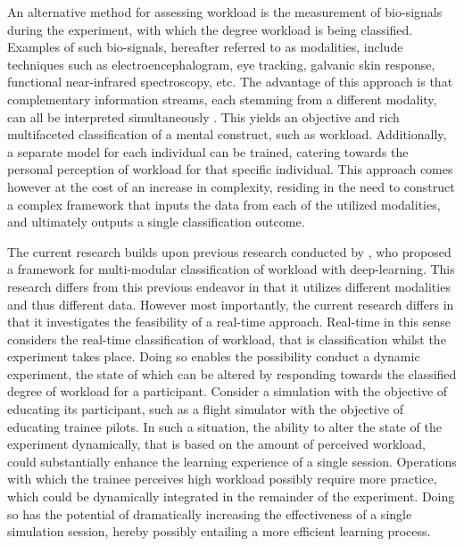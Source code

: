 \documentclass[12pt]{article}
\begin{document}
An alternative method for assessing workload is the measurement of bio-signals during the experiment, with which the degree workload is being classified. Examples of such bio-signals, hereafter referred to as modalities, include techniques such as electroencephalogram, eye tracking, galvanic skin response, functional near-infrared spectroscopy, etc. The advantage of this approach is that complementary information streams, each stemming from a different modality, can all be interpreted simultaneously \cite{ramachandram2017deep}. This yields an objective and rich multifaceted classification of a mental construct, such as workload. Additionally, a separate model for each individual can be trained, catering towards the personal perception of workload for that specific individual. This approach comes however at the cost of an increase in complexity, residing in the need to construct a complex framework that inputs the data from each of the utilized modalities, and ultimately outputs a single classification outcome. 

The current research builds upon previous research conducted by , who proposed a framework for multi-modular classification of workload with deep-learning. This research differs from this previous endeavor in that it utilizes different modalities and thus different data. However most importantly, the current research differs in that it investigates the feasibility of a real-time approach. Real-time in this sense considers the real-time classification of workload, that is classification whilst the experiment takes place. Doing so enables the possibility conduct a dynamic experiment, the state of which can be altered by responding towards the classified degree of workload for a participant. Consider a simulation with the objective of educating its participant, such as a flight simulator with the objective of educating trainee pilots. In such a situation, the ability to alter the state of the experiment dynamically, that is based on the amount of perceived workload, could substantially enhance the learning experience of a single session. Operations with which the trainee perceives high workload possibly require more practice, which could be dynamically integrated in the remainder of the experiment. Doing so has the potential of dramatically increasing the effectiveness of a single simulation session, hereby possibly entailing a more efficient learning process. 
\end{document}
